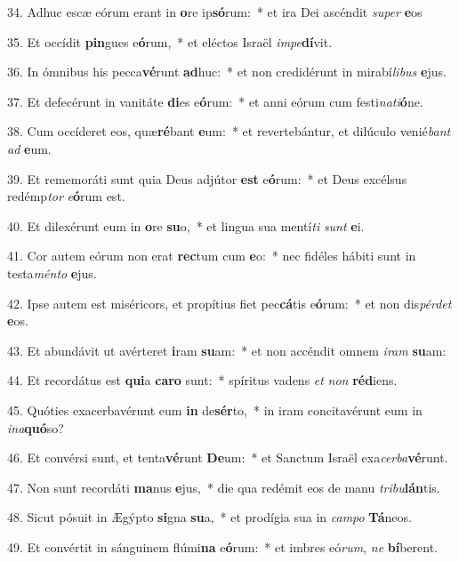 34. Adhuc escæ eórum erant in \textbf{o}re ip\textbf{só}rum:~*  et ira Dei ascéndit \textit{su}\textit{per} \textbf{e}os\

35. Et occídit \textbf{pin}gues e\textbf{ó}rum,~*  et eléctos Israël \textit{im}\textit{pe}\textbf{dí}vit.\

36. In ómnibus his pecca\textbf{vé}runt \textbf{ad}huc:~*  et non credidérunt in mirabí\textit{li}\textit{bus} \textbf{e}jus.\

37. Et defecérunt in vanitáte \textbf{di}es e\textbf{ó}rum:~*  et anni eórum cum festi\textit{na}\textit{ti}\textbf{ó}ne.\

38. Cum occíderet eos, quæ\textbf{ré}bant \textbf{e}um:~*  et revertebántur, et dilúculo venié\textit{bant} \textit{ad} \textbf{e}um.\

39. Et rememoráti sunt quia Deus adjútor \textbf{est} e\textbf{ó}rum:~*  et Deus excélsus redémp\textit{tor} \textit{e}\textbf{ó}rum est.\

40. Et dilexérunt eum in \textbf{o}re \textbf{su}o,~*  et lingua sua mentí\textit{ti} \textit{sunt} \textbf{e}i.\

41. Cor autem eórum non erat \textbf{rec}tum cum \textbf{e}o:~*  nec fidéles hábiti sunt in testa\textit{mén}\textit{to} \textbf{e}jus.\

42. Ipse autem est miséricors, et propítius fiet pec\textbf{cá}tis e\textbf{ó}rum:~*  et non dis\textit{pér}\textit{det} \textbf{e}os.\

43. Et abundávit ut avérteret \textbf{i}ram \textbf{su}am:~*  et non accéndit omnem \textit{i}\textit{ram} \textbf{su}am:\

44. Et recordátus est \textbf{qui}a \textbf{ca}\textbf{ro} sunt:~*  spíritus vadens \textit{et} \textit{non} \textbf{réd}iens.\

45. Quóties exacerbavérunt eum \textbf{in} de\textbf{sér}to,~*  in iram concitavérunt eum in \textit{in}\textit{a}\textbf{quó}so?\

46. Et convérsi sunt, et tenta\textbf{vé}runt \textbf{De}um:~*  et Sanctum Israël exa\textit{cer}\textit{ba}\textbf{vé}runt.\

47. Non sunt recordáti \textbf{ma}nus \textbf{e}jus,~*  die qua redémit eos de manu \textit{tri}\textit{bu}\textbf{lán}tis.\

48. Sicut pósuit in Ægýpto \textbf{si}gna \textbf{su}a,~*  et prodígia sua in \textit{cam}\textit{po} \textbf{Tá}neos.\

49. Et convértit in sánguinem flúmi\textbf{na} e\textbf{ó}rum:~*  et imbres eó\textit{rum}, \textit{ne} \textbf{bí}berent.\

